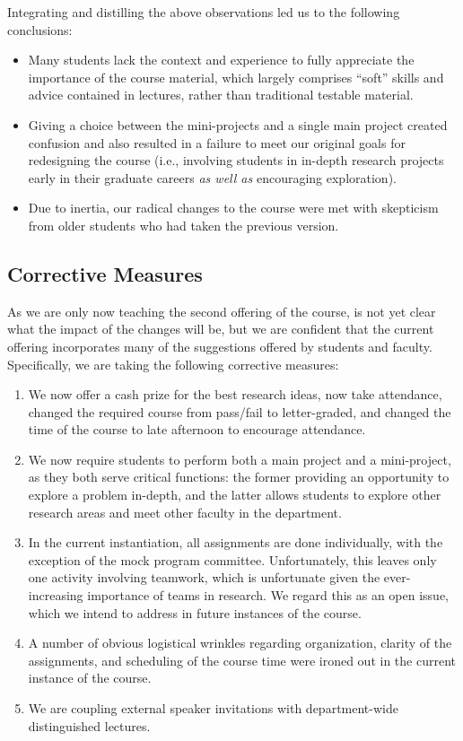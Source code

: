 Integrating and distilling the above observations led us to the
following conclusions:
\begin{itemize}
\itemsep=-1pt
\item Many students lack the context and experience to fully appreciate the
importance of the course material, which largely comprises ``soft''
skills and advice contained in lectures, rather than traditional
testable material.
\item Giving a choice between the mini-projects and a single main project
created confusion and also resulted in a failure to meet our original
goals for redesigning the course (i.e., involving students in in-depth
research projects early in their graduate careers {\em as well as}
encouraging exploration).
\item Due to inertia, our radical changes to the course were met with
  skepticism from older students who had taken the previous version.
\end{itemize}

\subsection{Corrective Measures}

As we are only now teaching the second offering of the course, is not
yet clear what the impact of the changes will be, but we are confident
that the current offering incorporates many of the suggestions offered
by students and faculty.  Specifically, we are taking the following
corrective measures:
\begin{enumerate}
\itemsep=-1pt
\item We now offer a cash prize for the best research ideas, now take
attendance, changed the required course from pass/fail to letter-graded,
and changed the time of the course to late afternoon to encourage
attendance.
\item We now require students to perform both a main project and a
mini-project, as they both serve critical functions: the former
providing an opportunity to explore a problem in-depth, and the latter
allows students to explore other research areas and meet other faculty
in the department.
\item In the current instantiation, all assignments are done individually,
with the exception of the mock program committee.  Unfortunately, this
leaves only one activity involving teamwork, which is unfortunate given
the ever-increasing importance of teams in research.  We regard this as
an open issue, which we intend to address in future instances of the
course.
\item A number of obvious logistical wrinkles regarding organization, clarity
of the assignments, and scheduling of the course time were ironed out in
the current instance of the course.
\item We are coupling external speaker invitations with department-wide
distinguished lectures.
\end{enumerate}

